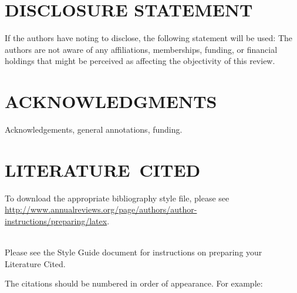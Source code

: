\documentclass{ar-1col}
\begin{document}
\section*{DISCLOSURE STATEMENT}
If the authors have noting to disclose, the following statement will be used: The authors are not aware of any affiliations, memberships, funding, or financial holdings that
might be perceived as affecting the objectivity of this review. 

\section*{ACKNOWLEDGMENTS}
Acknowledgements, general annotations, funding.

%
\section*{LITERATURE\ CITED}

To download the appropriate bibliography style file, please see \url{http://www.annualreviews.org/page/authors/author-instructions/preparing/latex}. 

\\

\noindent
Please see the Style Guide document for instructions on preparing your Literature Cited.

The citations should be numbered in order of appearance. For example:
\end{document}
